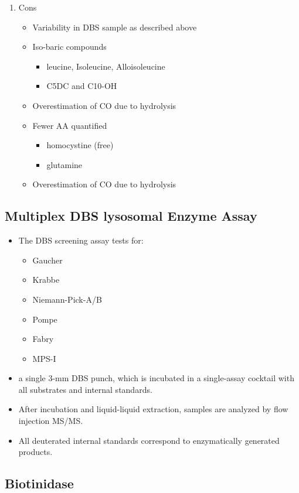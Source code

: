 \documentclass{scrartcl}
\begin{document}
\begin{enumerate}
\begin{enumerate}
\item Cons
\label{sec:orgcaf9ed7}
\begin{itemize}
\item Variability in DBS sample as described above
\item Iso-baric compounds
\begin{itemize}
\item leucine, Isoleucine, Alloisoleucine
\item C5DC and C10-OH
\end{itemize}
\item Overestimation of CO due to hydrolysis
\item Fewer AA quantified
\begin{itemize}
\item homocystine (free)
\item glutamine
\end{itemize}
\item Overestimation of CO due to hydrolysis
\end{itemize}
\end{enumerate}
\end{enumerate}
\subsection{Multiplex DBS lysosomal Enzyme Assay}
\label{sec:org2ad8767}
\begin{itemize}
\item The DBS screening assay tests for:
\begin{itemize}
\item Gaucher
\item Krabbe
\item Niemann-Pick-A/B
\item Pompe
\item Fabry
\item MPS-I
\end{itemize}
\item a single 3-mm DBS punch, which is incubated in a single-assay
cocktail with all substrates and internal standards.
\item After incubation and liquid-liquid extraction, samples are analyzed by flow injection MS/MS.
\item All deuterated internal standards correspond to enzymatically generated products.
\end{itemize}
\subsection{Biotinidase}
\label{sec:org6b4fd56}
\end{document}
